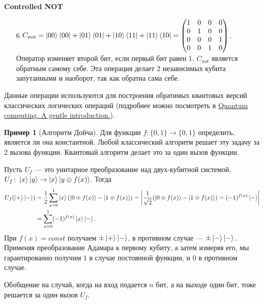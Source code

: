 \documentclass{article}
\theoremstyle{definition}
\newtheorem{example}{Пример}
\begin{document}
%
\textbf{Controlled NOT}
\begin{enumerate}
    \item[6] $C_{not} = \ket{00}\bra{00} + \ket{01}\bra{01} + \ket{10}\bra{11} + \ket{11}\bra{10} = 
    \begin{pmatrix}
    1 & 0 & 0 & 0 \\
    0 & 1 & 0 & 0 \\
    0 & 0 & 0 & 1 \\
    0 & 0 & 1 & 0 \\
    \end{pmatrix}$.\\
    Оператор изменяет второй бит, если первый бит равен $1$.
    $C_{not}$ является обратным самому себе.
    Эта операция делает 2 независимых кубита запутанными и наоборот, так как обратна сама себе.
\end{enumerate}

Данные операции используются для построения обратимых квантовых версий классических логических операций
(подробнее можно посмотреть в
\href{http://csis.pace.edu/ctappert/cs837-19spring/Rieffel-Quantum%20Computing.pdf}{Quantum computing. A gentle introduction.}).



\begin{example}[Алгоритм Дойча]
Для функции $f \colon \{0, 1\} \rightarrow \{0, 1\}$ определить, является ли она константной.
Любой классический алгоритм решает эту задачу за 2 вызова функции.
Квантовый алгоритм делает это за один вызов функции.

Пусть $U_f$ --- это унитарное преобразование над двух-кубитной системой,
$U_f \colon \ket{x}\ket{y} \rightarrow \ket{x}\ket{y \oplus f(x)}$.
Тогда 
\begin{align*}
U_f(\ket{+}\ket{-})
&=
\frac12\sum_{x=0}^1 \ket{x}(\ket{0 \oplus f(x)} - \ket{1 \oplus f(x)}) 
= \left |
\frac{1}{\sqrt{2}}(\ket{0 \oplus f(x)} - \ket{1 \oplus f(x)}) = (-1)^{f(x)}\ket{-}
\right | \\
&= \sum_{x=0}^1 (-1)^{f(x)} \ket{x} \ket{-}.
\end{align*}
При $f(x) = const$ получаем $\pm \ket{+}\ket{-}$, в противном случае --- $\pm \ket{-}\ket{-}$.
Применяя преобразование Адамара к первому кубиту, а затем измеряя его, мы гарантированно получим
$1$ в случае постоянной функции, и $0$ в противном случае.

Обобщение на случай, когда на вход подается $n$ бит, а на выходе один бит, тоже решается за один вызов $U_f$.
\end{example}
\end{document}
